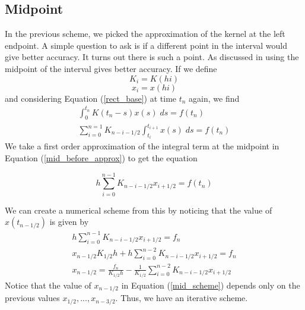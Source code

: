 \documentclass[11pt]{article}
\numberwithin{equation}{section}
\theoremstyle{definition}
\newcommand{\eqn}[2]{
  \begin{equation}
    \label{#1}
    #2
  \end{equation}
}
\newcommand{\eqr}[1]{Equation (\ref{#1})}
\begin{document}
\subsection{Midpoint}
In the previous scheme, we picked the approximation of the kernel at the left endpoint.
A simple question to ask is if a different point in the interval would give better
accuracy. It turns out there is such a point. As discussed in \cite{linz} using
the midpoint of the interval gives better accuracy. If we define
$$
  K_{i} = K(hi)
$$
$$
  x_{i} = x(hi)
$$
and considering \eqr{rect_base} at time $t_n$ again, we find
\begin{eqnarray}
\nonumber              \int_0^{t_n} K(t_n - s)x(s)\; ds = f(t_n) \\
\label{mid_before_approx}  \sum_{i=0}^{n=1} K_{n-i-1/2} \int_{t_i}^{t_{i+1}} x(s)\; ds = f(t_n)
\end{eqnarray}
We take a first order approximation of the integral term at the midpoint in
\eqr{mid_before_approx} to get the equation
\eqn{mid_discrete}{
  h\sum_{i=0}^{n-1} K_{n-i-1/2} x_{i+1/2} = f(t_n)
}
We can create a numerical scheme from this by noticing that the value of $x(t_{n-1/2})$
is given by
\begin{eqnarray}
\nonumber            h \sum_{i=0}^{n-1} K_{n-i-1/2} x_{i+1/2} = f_n \\
\nonumber            x_{n-1/2} K_{1/2} h + h\sum_{i=0}^{n-2} K_{n-i-1/2}x_{i+1/2} = f_n \\
\label{mid_scheme}  x_{n-1/2} = \frac{f_n}{K_{1/2} h} - \frac{1}{K_{1/2}} \sum_{i=0}^{n-2} K_{n-i-1/2} x_{i+1/2}
\end{eqnarray}
Notice that the value of $x_{n-1/2}$ in \eqr{mid_scheme} depends only on the previous
values $x_{1/2}, ..., x_{n-3/2}$. Thus, we have an iterative scheme.
\end{document}
